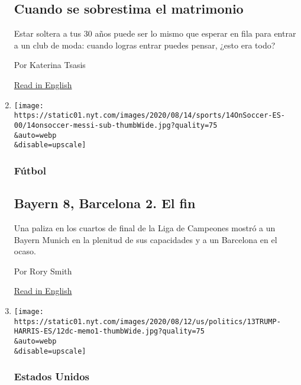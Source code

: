 \begin{enumerate}
  \hypertarget{cuando-se-sobrestima-el-matrimonio}{%
  \subsection{Cuando se sobrestima el
  matrimonio}\label{cuando-se-sobrestima-el-matrimonio}}

  Estar soltera a tus 30 años puede ser lo mismo que esperar en fila
  para entrar a un club de moda: cuando logras entrar puedes pensar,
  ¿esto era todo?

  Por Katerina Tsasis

  \href{https://www.nytimes.com/2020/08/07/style/modern-love-when-marriage-is-just-another-overhyped-nightclub.html}{Read
  in English}
\item
  \href{/es/2020/08/14/espanol/deportes/bayern-barcelona-8-2-champions-messi.html}{}

  \texttt{[image: https://static01.nyt.com/images/2020/08/14/sports/14OnSoccer-ES-00/14onsoccer-messi-sub-thumbWide.jpg?quality=75\\\&auto=webp\\\&disable=upscale]}

  \hypertarget{fuxfatbol}{%
  \subsubsection{Fútbol}\label{fuxfatbol}}

  \hypertarget{bayern-8-barcelona-2-el-fin}{%
  \subsection{Bayern 8, Barcelona 2. El
  fin}\label{bayern-8-barcelona-2-el-fin}}

  Una paliza en los cuartos de final de la Liga de Campeones mostró a un
  Bayern Munich en la plenitud de sus capacidades y a un Barcelona en el
  ocaso.

  Por Rory Smith

  \href{https://www.nytimes.com/2020/08/14/sports/soccer/bayern-barcelona-8-2-champions-league.html}{Read
  in English}
\item
  \href{/es/2020/08/14/espanol/mundo/trump-kamala-harris.html}{}

  \texttt{[image: https://static01.nyt.com/images/2020/08/12/us/politics/13TRUMP-HARRIS-ES/12dc-memo1-thumbWide.jpg?quality=75\\\&auto=webp\\\&disable=upscale]}

  \hypertarget{estados-unidos}{%
  \subsubsection{Estados Unidos}\label{estados-unidos}}


\end{enumerate}
